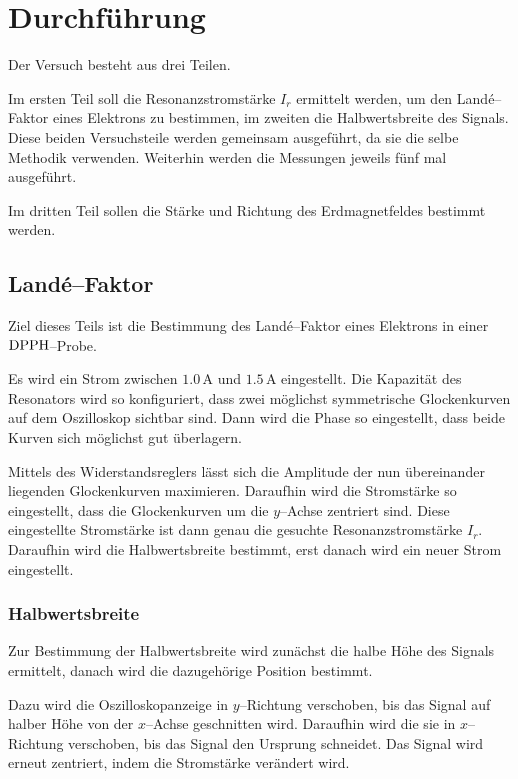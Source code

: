 \documentclass[12pt,a4paper]{scrartcl}
\numberwithin{equation}{section} %
\begin{document}
\clearpage
\hypertarget{durchfuxfchrung}{\section{Durchführung}\label{durchfuxfchrung}}
Der Versuch besteht aus drei Teilen.

Im ersten Teil soll die Resonanzstromstärke $I_r$ ermittelt werden, um den Landé--Faktor eines Elektrons zu bestimmen, im zweiten die Halbwertsbreite des Signals. Diese beiden Versuchsteile werden gemeinsam ausgeführt, da sie die selbe Methodik verwenden. Weiterhin werden die Messungen jeweils fünf mal ausgeführt.

Im dritten Teil sollen die Stärke und Richtung des Erdmagnetfeldes bestimmt werden.

\subsection{Landé--Faktor}
\label{durchfuxfchrung:Lande-Faktor}
Ziel dieses Teils ist die Bestimmung des Landé--Faktor eines Elektrons in einer $\ce{DPPH}$--Probe.

Es wird ein Strom zwischen $1.0\mathrm{\, A}$ und $1.5 \mathrm{\, A}$ eingestellt. Die Kapazität des Resonators wird so konfiguriert, dass zwei möglichst symmetrische Glockenkurven auf dem Oszilloskop sichtbar sind. Dann wird die Phase so eingestellt, dass beide Kurven sich möglichst gut überlagern.

Mittels des Widerstandsreglers lässt sich die Amplitude der nun übereinander liegenden Glockenkurven maximieren. Daraufhin wird die Stromstärke so eingestellt, dass die Glockenkurven um die $y$--Achse zentriert sind. Diese eingestellte Stromstärke ist dann genau die gesuchte Resonanzstromstärke $I_r$. Daraufhin wird die Halbwertsbreite bestimmt, erst danach wird ein neuer Strom eingestellt.

\subsubsection{Halbwertsbreite}
\label{durchfuxfchrung:Halbwertsbreite}
Zur Bestimmung der Halbwertsbreite wird zunächst die halbe Höhe des Signals ermittelt, danach wird die dazugehörige Position bestimmt.

Dazu wird die Oszilloskopanzeige in $y$--Richtung verschoben, bis das Signal auf halber Höhe von der $x$--Achse geschnitten wird.  Daraufhin wird die sie in $x$--Richtung verschoben, bis das Signal den Ursprung schneidet. Das Signal wird erneut zentriert, indem die Stromstärke verändert wird.
\end{document}
